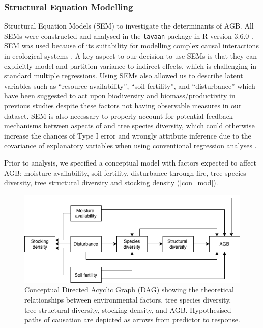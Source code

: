 \documentclass[11pt,a4paper]{article}
\begin{document}
\subsubsection{Structural Equation Modelling}

 Structural Equation Models (SEM) to investigate the determinants of AGB. All SEMs were constructed and analysed in the \verb|lavaan| package \citep{lavaan} in R version 3.6.0 \citep{R2019}. SEM was used because of its suitability for modelling complex causal interactions in ecological systems \citep{Lee2007}. A key aspect to our decision to use SEMs is that they can explicitly model and partition variance  to indirect effects, which is challenging in standard multiple regressions. Using SEMs also allowed us to describe latent variables such as ``resource availability'', ``soil fertility'', and ``disturbance'' which have been suggested to act upon biodiversity and biomass/productivity in previous studies despite these factors not having observable measures in our dataset. SEM is also necessary to properly account for potential feedback mechanisms between aspects of  and tree species diversity, which could otherwise increase the chances of Type I error and wrongly attribute inference due to the covariance of explanatory variables when using conventional regression analyses \citep{Nachtigall2003}.

Prior to analysis, we specified a conceptual model with factors expected to affect AGB: moisture availability, soil fertility, disturbance through fire, tree species diversity, tree structural diversity and stocking density (\autoref{con_mod}). 

\begin{figure}[H]
\centering
\includegraphics[width=\textwidth]{concept}
	\caption{Conceptual Directed Acyclic Graph (DAG) showing the theoretical relationships between environmental factors, tree species diversity, tree structural diversity, stocking density, and AGB. Hypothesised paths of causation are depicted as arrows from predictor to response.}
	\label{con_mod}
\end{figure}
\end{document}
